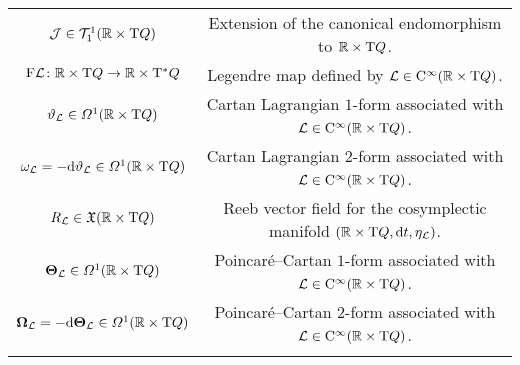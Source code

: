 \documentclass[12pt]{report}
\def\vf{\mathfrak X}
\def\df{{\mit\Omega}}
\def\Lag{{\cal L}}
\def\d{{\rm d}}
\def\Real{\mathbb{R}}
\def\Tan{{\rm T}}
\def\Cinfty{{\rm C}^\infty}
\begin{document}
\begin{center}
{\begin{tabular}{|c|c|}
${\cal J}\in{\cal T}^1_1(\Real\times\Tan Q)$ & Extension of the canonical endomorphism to $\Real\times\Tan Q$. \\
 ${\rm F}\Lag\colon\Real\times\Tan Q\to\Real\times\Tan^*Q$ &
 Legendre map defined by $\Lag\in\Cinfty(\Real\times\Tan Q)$. \\
$\vartheta_\Lag\in\df^1(\Real\times\Tan Q)$ &
Cartan Lagrangian $1$-form associated with $\Lag\in\Cinfty(\Real\times\Tan Q)$. \\
$\omega_\Lag=-\d\vartheta_\Lag\in\df^1(\Real\times\Tan Q)$ &
Cartan Lagrangian $2$-form associated with $\Lag\in\Cinfty(\Real\times\Tan Q)$. \\
$R_\Lag\in\vf(\Real\times\Tan Q)$ &
Reeb vector field for the cosymplectic manifold 
$(\Real\times\Tan Q,\d t,\eta_\Lag)$. \\
$\mbox{\boldmath $\Theta$}_{\cal L}\in\df^1(\Real\times\Tan Q)$ &
Poincar\'e--Cartan $1$-form associated with $\Lag\in\Cinfty(\Real\times\Tan Q)$. \\
$\mbox{\boldmath $\Omega$}_{\cal L}=-\d\mbox{\boldmath $\Theta$}_{\cal L}\in\df^1(\Real\times\Tan Q)$ &
Poincar\'e--Cartan $2$-form associated with $\Lag\in\Cinfty(\Real\times\Tan Q)$. \\
 & \\
\hline
\end{tabular}
}
\end{center}
\end{document}
